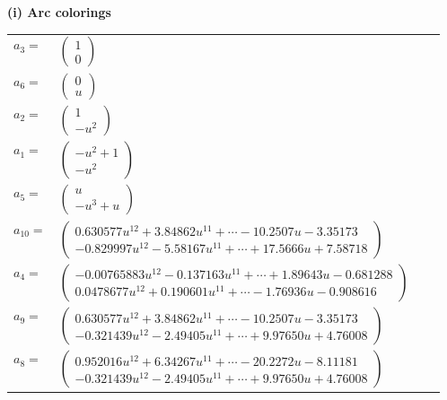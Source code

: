 \documentclass[1p]{elsarticle_modified}
\theoremstyle{definition}
\begin{document}
\flushleft \textbf{(i) Arc colorings}\\
\begin{tabular}{m{7pt} m{180pt} m{7pt} m{180pt} }
\flushright $a_{3}=$&$\begin{pmatrix}1\\0\end{pmatrix}$ \\
\flushright $a_{6}=$&$\begin{pmatrix}0\\u\end{pmatrix}$ \\
\flushright $a_{2}=$&$\begin{pmatrix}1\\- u^2\end{pmatrix}$ \\
\flushright $a_{1}=$&$\begin{pmatrix}- u^2+1\\- u^2\end{pmatrix}$ \\
\flushright $a_{5}=$&$\begin{pmatrix}u\\- u^3+u\end{pmatrix}$ \\
\flushright $a_{10}=$&$\begin{pmatrix}0.630577 u^{12}+3.84862 u^{11}+\cdots-10.2507 u-3.35173\\-0.829997 u^{12}-5.58167 u^{11}+\cdots+17.5666 u+7.58718\end{pmatrix}$ \\
\flushright $a_{4}=$&$\begin{pmatrix}-0.00765883 u^{12}-0.137163 u^{11}+\cdots+1.89643 u-0.681288\\0.0478677 u^{12}+0.190601 u^{11}+\cdots-1.76936 u-0.908616\end{pmatrix}$ \\
\flushright $a_{9}=$&$\begin{pmatrix}0.630577 u^{12}+3.84862 u^{11}+\cdots-10.2507 u-3.35173\\-0.321439 u^{12}-2.49405 u^{11}+\cdots+9.97650 u+4.76008\end{pmatrix}$ \\
\flushright $a_{8}=$&$\begin{pmatrix}0.952016 u^{12}+6.34267 u^{11}+\cdots-20.2272 u-8.11181\\-0.321439 u^{12}-2.49405 u^{11}+\cdots+9.97650 u+4.76008\end{pmatrix}$ \\

\end{tabular}
\end{document}
